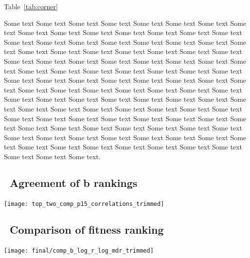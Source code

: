 \begin{multicols}{2}
Table~\ref{tab:corner}

  Some text Some text Some text Some text Some text Some text Some
  text Some text Some text Some text Some text Some text Some text
  Some text Some text Some text Some text Some text Some text Some
  text Some text Some text Some text Some text Some text Some text
  Some text Some text Some text Some text Some text Some text Some
  text Some text Some text Some text Some text Some text Some text
  Some text Some text Some text Some text Some text Some text Some
  text Some text Some text Some text Some text Some text Some text
  Some text Some text Some text Some text Some text Some text Some
  text Some text Some text Some text Some text Some text Some text
  Some text Some text Some text Some text Some text Some text Some
  text Some text Some text Some text Some text Some text Some text
  Some text Some text Some text Some text Some text Some text Some
  text Some text Some text Some text Some text Some text Some text
  Some text Some text Some text Some text Some text Some text Some
  text Some text Some text Some text Some text Some text Some text
  Some text Some text Some text Some text.

\subsection{\thesubsection~Agreement of b rankings}

\graphicspath{{images/rank/}}
\begin{Figure}
  \centering
  \texttt{[image: top\_two\_comp\_p15\_correlations\_trimmed]}
  \label{fig:comp_b_ranking}
\end{Figure}

\subsection{\thesubsection~Comparison of fitness ranking}

\graphicspath{{images/rank/}}
\begin{Figure}
  \centering
  \texttt{[image: final/comp\_b\_log\_r\_log\_mdr\_trimmed]}
  \label{fig:comp_vs_log_ranking}
\end{Figure}



\end{multicols}
